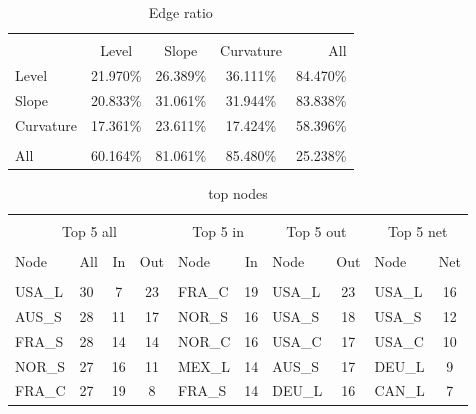 \documentclass{article}
\begin{document}

\begin{table}[h]
\caption{Edge ratio} %
\fontsize{10}{10}\selectfont
\centering%
\begin{tabular}{l | ccc  r}%
\hline\hline \\ [-1.5ex]                         %


	&	Level	&	Slope	&	Curvature	&	All	\\
Level	&	21.970\%	&	26.389\%	&	36.111\%	&	84.470\%	\\
Slope	&	20.833\%	&	31.061\%	&	31.944\%	&	83.838\%	\\
Curvature	&	17.361\%	&	23.611\%	&	17.424\%	&	58.396\%	\\
\hline \\ [-1.5ex]  
All	&	60.164\%	&	81.061\%	&	85.480\%	&	25.238\%	\\


\hline            
\end{tabular}
\label{table:nonlin}%
\end{table}


\begin{table}[h]
\caption{top nodes} %
\fontsize{10}{10}\selectfont
\setlength{\tabcolsep}{12pt}
\centering%
\begin{tabular}{l  lcc  lc lc  lc}%

\hline\hline \\ [-1.5ex]                         %


\multicolumn{4}{c}{Top 5 all}					&	\multicolumn{2}{c}{Top 5 in}			&	\multicolumn{2}{c}{Top 5 out}			&	\multicolumn{2}{c}{Top 5 net}	\\	
\hline \\ [-1.5ex]    
Node	&	All	&	In	&	Out	&	Node	&	In	&	Node	&	Out	&	Node	&	Net	\\
\hline \\ [-1.5ex]    
USA\_L&	30	&	7	&	23	&	FRA\_C	&	19	&	USA\_L	&	23	&	USA\_L	&	16	\\
AUS\_S	&	28	&	11	&	17	&	NOR\_S	&	16	&	USA\_S	&	18	&	USA\_S	&	12	\\
FRA\_S	&	28	&	14	&	14	&	NOR\_C	&	16	&	USA\_C	&	17	&	USA\_C	&	10	\\
NOR\_S	&	27	&	16	&	11	&	MEX\_L	&	14	&	AUS\_S	&	17	&	DEU\_L	&	9	\\
FRA\_C	&	27	&	19	&	8	&	FRA\_S	&	14	&	DEU\_L	&	16	&	CAN\_L	&	7	\\




\hline            
\end{tabular}
\label{table:nonlin}%
\end{table}






\end{document}
